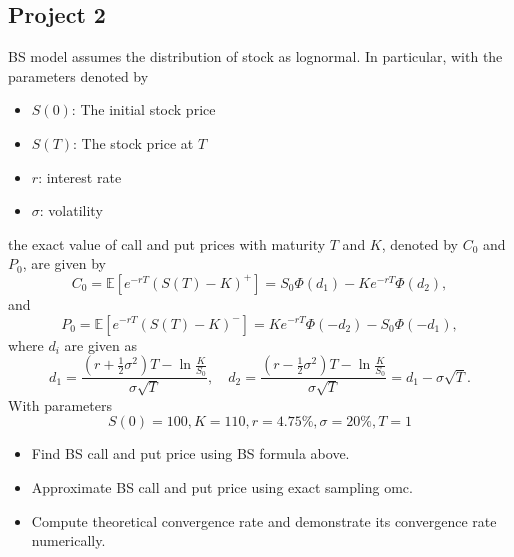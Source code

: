\documentclass{article}
\begin{document}
\subsection{Project 2}
BS model assumes the distribution of stock as lognormal. In particular, with the parameters denoted by
\begin{itemize}
 \item  $S(0)$: The initial stock price
 \item
 $S(T)$: The stock price at $T$
 \item
 $r$: interest rate
 \item $\sigma$: volatility
\end{itemize}
the exact value of call and put prices with maturity $T$ and $K$, denoted by $C_0$ and $P_0$, are given by
$$C_0 = \mathbb E [e^{-rT} (S(T) - K)^+] = S_0  \Phi(d_1) - K e^{-rT} \Phi(d_2),$$
and 
$$P_0 = \mathbb E [e^{-rT} (S(T) - K)^-] = K e^{-rT} \Phi(- d_2) - S_0  \Phi(- d_1),$$
where $d_i$ are given as
$$d_1 = \frac{(r + \frac 1 2 \sigma^2) T - \ln \frac{K}{S_0}}{\sigma \sqrt T}, 
\quad 
d_2 = \frac{(r - \frac 1 2 \sigma^2) T - \ln \frac{K}{S_0}}{\sigma \sqrt T} = d_1 - \sigma \sqrt T.$$
With parameters $$S(0) = 100, K = 110, r = 4.75\%, \sigma = 20\%, T = 1$$
\begin{itemize}
 \item Find BS call and put price using BS formula above.
 \item Approximate BS call and put price using exact sampling omc.
 \item Compute theoretical convergence rate and demonstrate its convergence rate numerically.
\end{itemize}
\end{document}
